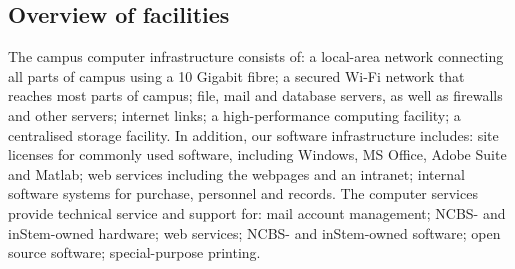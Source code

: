 \documentclass[a4paper,10pt]{article}
\begin{document}
\subsection{Overview of facilities}
The campus computer infrastructure consists of: a local-area
network connecting all parts of campus using a 10 Gigabit fibre; a secured Wi-Fi network
that reaches most parts of campus; file, mail and database servers, as well as firewalls and
other servers; internet links; a high-performance computing facility; a centralised storage
facility. In addition, our software infrastructure includes: site licenses for commonly used
software, including Windows, MS Office, Adobe Suite and Matlab; web services including
the webpages and an intranet; internal software systems for purchase, personnel and records.
The computer services provide technical service and support for: mail account management;
NCBS- and inStem-owned hardware; web services; NCBS- and inStem-owned software;
open source software; special-purpose printing.
\end{document}
